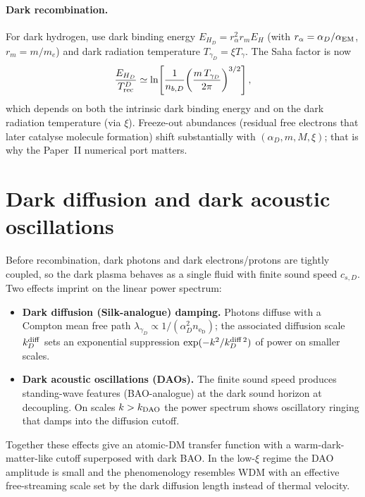 \documentclass[12pt]{article}
\newcommand{\eD}{\mathrm{e_D}}
\newcommand{\gD}{\gamma_D}
\newcommand{\alphaD}{\alpha_D}
\newcommand{\ra}{r_\alpha}
\newcommand{\rmm}{r_m}      %
\begin{document}
\paragraph{Dark recombination.}  For dark hydrogen, use dark binding
energy $E_{H_D} = \ra^2 \rmm E_H$ (with $\ra = \alpha_D/\alpha_{\rm
EM}$, $\rmm = m/m_e$) and dark radiation temperature $T_{\gD} =
\xi T_\gamma$.  The Saha factor is now
%
\begin{equation}
  \frac{E_{H_D}}{T_{\rm rec}^D}
    \simeq \ln\!\left[\frac{1}{n_{b,D}}\!\left(\frac{m\,T_{\gD}}{2\pi}\right)^{3/2}\right],
\end{equation}
%
which depends on both the intrinsic dark binding energy and on the
dark radiation temperature (via $\xi$).  Freeze-out abundances
(residual free electrons that later catalyse molecule formation)
shift substantially with $(\alpha_D, m, M, \xi)$; that is why the
Paper~II numerical port matters.

\section{Dark diffusion and dark acoustic oscillations}
\label{sec:dao}

Before recombination, dark photons and dark electrons/protons are
tightly coupled, so the dark plasma behaves as a single fluid with
finite sound speed $c_{s,D}$.  Two effects imprint on the linear
power spectrum:
%
\begin{itemize}
  \item \textbf{Dark diffusion (Silk-analogue) damping.}
        Photons diffuse with a Compton mean free path
        $\lambda_{\gD} \propto 1/(\alphaD^2 n_{\eD})$;
        the associated diffusion scale $k_D^{\rm diff}$ sets an
        exponential suppression $\exp(-k^2/k_D^{\rm diff\,2})$ of
        power on smaller scales.
  \item \textbf{Dark acoustic oscillations (DAOs).}
        The finite sound speed produces standing-wave features
        (BAO-analogue) at the dark sound horizon at decoupling.
        On scales $k > k_{\rm DAO}$ the power spectrum shows
        oscillatory ringing that damps into the diffusion cutoff.
\end{itemize}
%
Together these effects give an atomic-DM transfer function with a
warm-dark-matter-like cutoff superposed with dark BAO.  In the
low-$\xi$ regime the DAO amplitude is small and the phenomenology
resembles WDM with an effective free-streaming scale set by the dark
diffusion length instead of thermal velocity.
\end{document}
